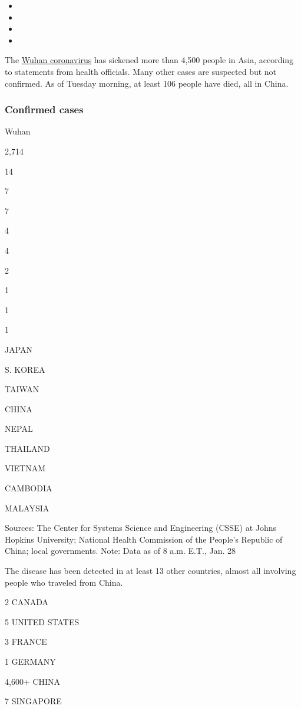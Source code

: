 \begin{itemize}
\item
\item
\item
\item
\end{itemize}

The
\href{https://www.nytimes3xbfgragh.onion/2020/01/28/world/asia/china-coronavirus.html}{Wuhan
coronavirus} has sickened more than 4,500 people in Asia, according to
statements from health officials. Many other cases are suspected but not
confirmed. As of Tuesday morning, at least 106 people have died, all in
China.

\hypertarget{confirmed-cases}{%
\subsubsection{Confirmed cases}\label{confirmed-cases}}

Wuhan

2,714

14

7

7

4

4

2

1

1

1

JAPAN

S. KOREA

TAIWAN

CHINA

NEPAL

THAILAND

VIETNAM

CAMBODIA

MALAYSIA

Sources: The Center for Systems Science and Engineering (CSSE) at Johns
Hopkins University; National Health Commission of the People's Republic
of China; local governments. Note: Data as of 8 a.m. E.T., Jan. 28

The disease has been detected in at least 13 other countries, almost all
involving people who traveled from China.

2 CANADA

5 UNITED STATES

3 FRANCE

1 GERMANY

4,600+ CHINA

7 SINGAPORE

